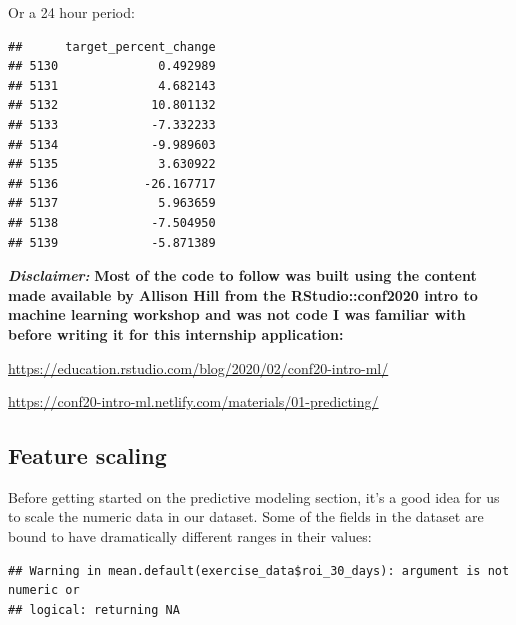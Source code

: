 \documentclass[
]{book}
\newenvironment{Shaded}{\begin{snugshade}}{\end{snugshade}}
\newcommand{\DecValTok}[1]{\textcolor[rgb]{0.00,0.00,0.81}{#1}}
\newcommand{\KeywordTok}[1]{\textcolor[rgb]{0.13,0.29,0.53}{\textbf{#1}}}
\newcommand{\NormalTok}[1]{#1}
\newcommand{\OperatorTok}[1]{\textcolor[rgb]{0.81,0.36,0.00}{\textbf{#1}}}
\newcommand{\StringTok}[1]{\textcolor[rgb]{0.31,0.60,0.02}{#1}}
\begin{document}
Or a 24 hour period:

\begin{Shaded}
\end{Shaded}

\begin{verbatim}
##      target_percent_change
## 5130              0.492989
## 5131              4.682143
## 5132             10.801132
## 5133             -7.332233
## 5134             -9.989603
## 5135              3.630922
## 5136            -26.167717
## 5137              5.963659
## 5138             -7.504950
## 5139             -5.871389
\end{verbatim}

\textbf{\emph{Disclaimer:}} \textbf{Most of the code to follow was built using the content made available by Allison Hill from the RStudio::conf2020 intro to machine learning workshop and was not code I was familiar with before writing it for this internship application:}

\url{https://education.rstudio.com/blog/2020/02/conf20-intro-ml/}

\url{https://conf20-intro-ml.netlify.com/materials/01-predicting/}

\hypertarget{feature-scaling}{%
\subsection{Feature scaling}\label{feature-scaling}}

Before getting started on the predictive modeling section, it's a good idea for us to scale the numeric data in our dataset. Some of the fields in the dataset are bound to have dramatically different ranges in their values:

\begin{Shaded}
\end{Shaded}

\begin{verbatim}
## Warning in mean.default(exercise_data$roi_30_days): argument is not numeric or
## logical: returning NA
\end{verbatim}
\end{document}
